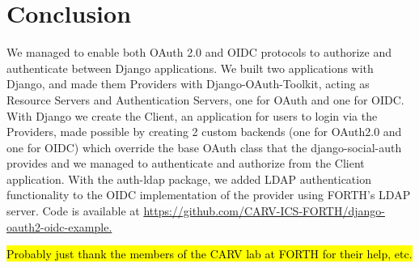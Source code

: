 \section{Conclusion}
We managed to enable both OAuth 2.0 and OIDC protocols to authorize and authenticate between Django applications. We built two applications with Django, and made them Providers with Django-OAuth-Toolkit, acting as Resource Servers and Authentication Servers, one for OAuth and one for OIDC. With Django we create the Client, an application for users to login via the Providers, made possible by creating 2 custom backends (one for OAuth2.0 and one for OIDC) which override the base OAuth class that the django-social-auth provides and we managed to authenticate and authorize from the Client application. With the auth-ldap package, we added LDAP authentication functionality to the OIDC implementation of the provider using FORTH's LDAP server. Code is available at \href{https://github.com/CARV-ICS-FORTH/django-oauth2-oidc-example}{https://github.com/CARV-ICS-FORTH/django-oauth2-oidc-example.}


\begin{acks}
\hl{Probably just thank the members of the CARV lab at FORTH for their help, etc.}
\end{acks}
